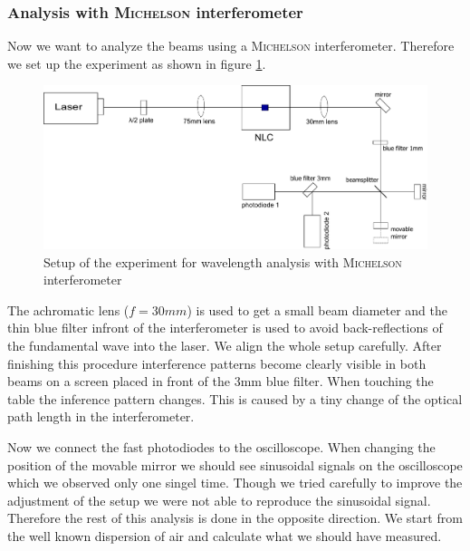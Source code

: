 \documentclass{protokoll_en}
\begin{document}
\subsubsection{Analysis with \textsc{Michelson} interferometer}\label{subsubsec:ana_michelson}
Now we want to analyze the beams using a \textsc{Michelson} interferometer. Therefore we set up the experiment as shown in figure \ref{fig:setup_michelson}.
\begin{figure}[H]
  \centering
  \includegraphics[width=1.0\textwidth]{graphics/setup_michelson}
  \caption{Setup of the experiment for wavelength analysis with \textsc{Michelson} interferometer}
  \label{fig:setup_michelson}
\end{figure}
The achromatic lens ($f=30mm$) is used to get a small beam diameter and the thin blue filter infront of the interferometer is used to avoid back-reflections of the fundamental wave into the laser. We align the whole setup carefully. After finishing this procedure interference patterns become clearly visible in both beams on a screen placed in front of the 3mm blue filter. When touching the table the inference pattern changes. This is caused by a tiny change of the optical path length in the interferometer.

Now we connect the fast photodiodes to the oscilloscope. When changing the position of the movable mirror we should see sinusoidal signals on the oscilloscope which we observed only one singel time. Though we tried carefully to improve the adjustment of the setup we were not able to reproduce the sinusoidal signal. Therefore the rest of this analysis is done in the opposite direction. We start from the well known dispersion of air and calculate what we should have measured.
\end{document}
